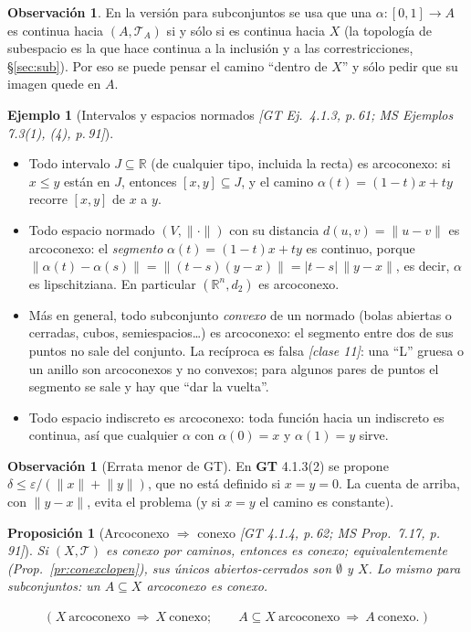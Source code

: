 \documentclass[11pt,a4paper]{article}
\newenvironment{lista}{\leavevmode\begin{itemize}[leftmargin=1.5em,itemsep=1pt,topsep=2pt,parsep=0pt]}{\end{itemize}}
\newcommand{\lgc}[1]{\par\vspace{-3pt}\begin{gather*}\big(\;#1\;\big)\end{gather*}\vspace{-6pt}}
\theoremstyle{definition}
\newtheorem{ejemplo}[definicion]{Ejemplo}
\newtheorem{observacion}[definicion]{Observación}
\theoremstyle{plain}
\newtheorem{proposicion}[definicion]{Proposición}
\newcommand{\fnt}[1]{{\normalfont\small\itshape\color{gray!150!black}[#1]}}
\newcommand{\R}{\mathbb{R}}
\newcommand{\norm}[1]{\lVert #1 \rVert}
\newcommand{\tp}{\mathcal{T}}
\begin{document}
\begin{observacion}
En la versión para subconjuntos se usa que una $\alpha:[0,1]\to A$ es continua hacia $(A,\tp_A)$ si y sólo si es continua hacia $X$ (la topología de subespacio es la que hace continua a la inclusión y a las correstricciones, \S\ref{sec:sub}). Por eso se puede pensar el camino ``dentro de $X$'' y sólo pedir que su imagen quede en $A$.
\end{observacion}

\begin{ejemplo}[Intervalos y espacios normados \fnt{GT Ej.\ 4.1.3, p.\,61; MS Ejemplos 7.3(1), (4), p.\,91}]\label{cc:segmentos}
\begin{lista}
\item Todo intervalo $J\subseteq\R$ (de cualquier tipo, incluida la recta) es arcoconexo: si $x\le y$ están en $J$, entonces $[x,y]\subseteq J$, y el camino $\alpha(t)=(1-t)x+ty$ recorre $[x,y]$ de $x$ a $y$.
\item Todo espacio normado $(V,\norm{\cdot})$ con su distancia $d(u,v)=\norm{u-v}$ es arcoconexo: el \emph{segmento} $\alpha(t)=(1-t)x+ty$ es continuo, porque
$\norm{\alpha(t)-\alpha(s)}=\norm{(t-s)(y-x)}=|t-s|\,\norm{y-x}$, es decir, $\alpha$ es lipschitziana. En particular $(\R^n,d_2)$ es arcoconexo.
\item Más en general, todo subconjunto \emph{convexo} de un normado (bolas abiertas o cerradas, cubos, semiespacios\dots) es arcoconexo: el segmento entre dos de sus puntos no sale del conjunto. La recíproca es falsa \fnt{clase 11}: una ``L'' gruesa o un anillo son arcoconexos y no convexos; para algunos pares de puntos el segmento se sale y hay que ``dar la vuelta''.
\item Todo espacio indiscreto es arcoconexo: toda función hacia un indiscreto es continua, así que cualquier $\alpha$ con $\alpha(0)=x$ y $\alpha(1)=y$ sirve.
\end{lista}
\end{ejemplo}

\begin{observacion}[Errata menor de GT]
En \textbf{GT} 4.1.3(2) se propone $\delta\le\varepsilon/(\norm x+\norm y)$, que no está definido si $x=y=0$. La cuenta de arriba, con $\norm{y-x}$, evita el problema (y si $x=y$ el camino es constante).
\end{observacion}

\begin{proposicion}[Arcoconexo $\Rightarrow$ conexo \fnt{GT 4.1.4, p.\,62; MS Prop.\ 7.17, p.\,91}]\label{cc:arcoconexo}
Si $(X,\tp)$ es conexo por caminos, entonces es conexo; equivalentemente (Prop.~\ref{pr:conexclopen}), sus únicos abiertos-cerrados son $\emptyset$ y $X$. Lo mismo para subconjuntos: un $A\subseteq X$ arcoconexo es conexo.
\lgc{X\ \text{arcoconexo}\ \Rightarrow\ X\ \text{conexo};\qquad A\subseteq X\ \text{arcoconexo}\ \Rightarrow\ A\ \text{conexo}.}
\end{proposicion}
\end{document}
